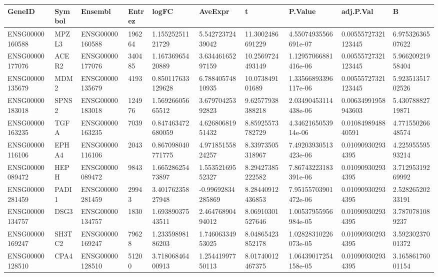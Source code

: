 \begingroup
\tiny
\setlength{\tabcolsep}{2pt}
\renewcommand{\arraystretch}{1.18}
\begin{tabular}{@{}llllllllll@{}}
\toprule
GeneID & Symbol & Ensembl & Entrez & logFC & AveExpr & t & P.Value & adj.P.Val & B \\
\midrule
ENSG00000160588 & MPZL3 & ENSG00000160588 & 196264 & 1.15525251121729 & 5.54272372439042 & 11.3002486691229 & 4.55074935566691e-07 & 0.00555727321123445 & 6.97532636507622 \\
ENSG00000177076 & ACER2 & ENSG00000177076 & 340485 & 1.16736965420889 & 3.63446165297159 & 10.2569724493149 & 1.12957066881416e-06 & 0.00555727321123445 & 5.96620921958404 \\
ENSG00000135679 & MDM2 & ENSG00000135679 & 4193 & 0.850117633129628 & 6.78840574810935 & 10.073849101689 & 1.33566893396117e-06 & 0.00555727321123445 & 5.92351351702526 \\
ENSG00000183018 & SPNS2 & ENSG00000183018 & 124976 & 1.56926605665512 & 3.67970425392823 & 9.62577938388218 & 2.03490453114438e-06 & 0.00634991958943603 & 5.43078882719871 \\
ENSG00000163235 & TGFA & ENSG00000163235 & 7039 & 0.847463472680059 & 4.62680681951432 & 8.85925573782729 & 4.3462165053914e-06 & 0.0108498948840591 & 4.77155026648574 \\
ENSG00000116106 & EPHA4 & ENSG00000116106 & 2043 & 0.867098040771775 & 4.97185155824257 & 8.33973505318967 & 7.49203930513423e-06 & 0.010909302934395 & 4.22595559593214 \\
ENSG00000089472 & HEPH & ENSG00000089472 & 9843 & 1.66528625473897 & 1.55352169552327 & 8.29427385222582 & 7.86743223183391e-06 & 0.010909302934395 & 3.71295319269992 \\
ENSG00000281459 & PADI1 & ENSG00000281459 & 29943 & 3.40176235827948 & -0.99692834285869 & 8.28440912436853 & 7.95155703901472e-06 & 0.010909302934395 & 2.52826520233191 \\
ENSG00000134757 & DSG3 & ENSG00000134757 & 1830 & 1.69389037543511 & 2.46476890494012 & 8.06910301527646 & 1.00537955956984e-05 & 0.010909302934395 & 3.7870781089237 \\
ENSG00000169247 & SH3TC2 & ENSG00000169247 & 79628 & 1.23359898186203 & 1.74606334953025 & 8.04865423852178 & 1.02828310226073e-05 & 0.010909302934395 & 3.59230237001372 \\
ENSG00000128510 & CPA4 & ENSG00000128510 & 51200 & 3.71806846400913 & 1.25441997750113 & 8.01740012467375 & 1.06439017254158e-05 & 0.010909302934395 & 3.16586176001154 \\

\end{tabular}
